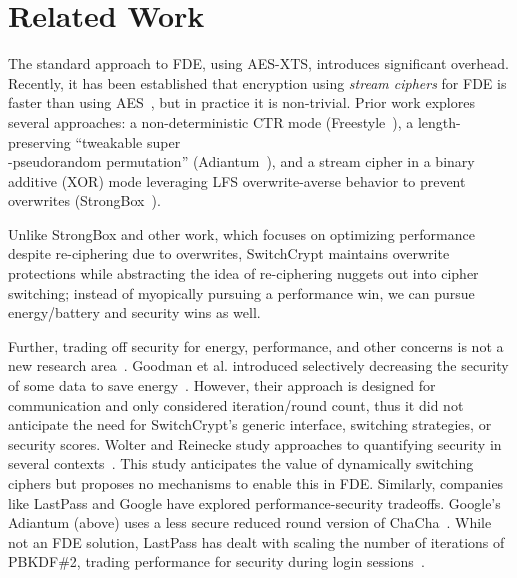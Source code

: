 \section{Related Work} \label{sec:related}

The standard approach to FDE, using AES-XTS, introduces significant overhead.
Recently, it has been established that encryption using \emph{stream ciphers}
for FDE is faster than using AES~\cite{StrongBox}, but in practice it is
non-trivial. Prior work explores several approaches: a non-deterministic CTR
mode (Freestyle~\cite{Freestyle}), a length-preserving ``tweakable
super\\-pseudorandom permutation'' (Adiantum~\cite{Adiantum}), and a stream cipher
in a binary additive (XOR) mode leveraging LFS overwrite-averse behavior to
prevent overwrites (StrongBox~\cite{StrongBox}).

Unlike StrongBox and other work, which focuses on optimizing performance despite
re-ciphering due to overwrites, SwitchCrypt maintains overwrite protections
while abstracting the idea of re-ciphering nuggets out into cipher switching;
instead of myopically pursuing a performance win, we can pursue energy/battery
and security wins as well.

Further, trading off security for energy, performance, and other concerns is not
a new research area~\cite{ScalableSecurity, WolterReinecke, ZengChow1,
HaleemEtAl, LiOmiecinski, Merkel4, Merkle3}. Goodman et al. introduced
selectively decreasing the security of some data to save
energy~\cite{ScalableSecurity}. However, their approach is designed for
communication and only considered iteration/round count, thus it did not
anticipate the need for SwitchCrypt's generic interface, switching strategies,
or security scores. Wolter and Reinecke study approaches to quantifying security
in several contexts~\cite{WolterReinecke}. This study anticipates the value of
dynamically switching ciphers but proposes no mechanisms to enable this in FDE.
Similarly, companies like LastPass and Google have explored performance-security
tradeoffs. Google's Adiantum (above) uses a less secure reduced round version of
ChaCha~\cite{Adiantum}. While not an FDE solution, LastPass has dealt with
scaling the number of iterations of PBKDF\#2, trading performance for security
during login sessions~\cite{LastPass}.

